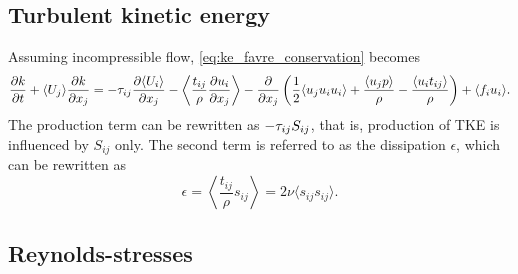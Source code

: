 \documentclass[oneside,a4paper,11pt]{report}
\begin{document}
\subsection{Turbulent kinetic energy}
Assuming incompressible flow, \cref{eq:ke_favre_conservation} becomes  
\begin{equation}
\label{eq:tke_ransflow}
\frac{\partial k}{\partial t} + \langle U_j \rangle \frac{\partial k}{\partial x_j} = -\tau_{ij} \frac{ \partial \langle U_i \rangle }{ \partial x_j} - \left < \frac{ t_{ij} }{\rho} \frac{ \partial u_i }{ \partial x_j} \right > - \frac{\partial}{\partial x_j} \left ( \frac{1}{2} \langle u_j u_i u_i \rangle + \frac{ \langle u_j p \rangle }{ \rho } - \frac{ \langle u_i t_{ij} \rangle }{ \rho } \right ) + \langle f_i u_i \rangle .
\end{equation}
The production term can be rewritten as $-\tau_{ij} S_{ij}$, that is, production of TKE is influenced by $S_{ij}$ only. The second term is referred to as the dissipation $\epsilon$, which can be rewritten as
\begin{equation}
\epsilon = \left < \frac{ t_{ij} }{ \rho } s_{ij} \right > = 2 \nu \langle s_{ij} s_{ij} \rangle.
\end{equation}

\subsection{Reynolds-stresses}
\end{document}
